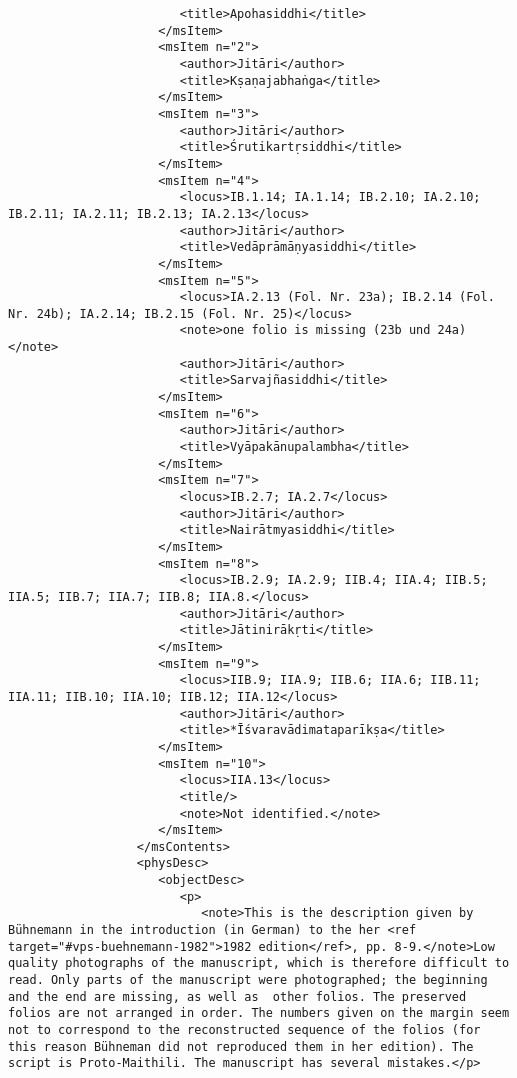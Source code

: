 \documentclass[article,12pt,a4paper]{memoir}%
\begin{document}
\begin{verbatim}
                        <title>Apohasiddhi</title>
                     </msItem>
                     <msItem n="2">
                        <author>Jitāri</author>
                        <title>Kṣaṇajabhaṅga</title>
                     </msItem>
                     <msItem n="3">
                        <author>Jitāri</author>
                        <title>Śrutikartṛsiddhi</title>
                     </msItem>
                     <msItem n="4">
                        <locus>IB.1.14; IA.1.14; IB.2.10; IA.2.10; IB.2.11; IA.2.11; IB.2.13; IA.2.13</locus>
                        <author>Jitāri</author>
                        <title>Vedāprāmāṇyasiddhi</title>
                     </msItem>
                     <msItem n="5">
                        <locus>IA.2.13 (Fol. Nr. 23a); IB.2.14 (Fol. Nr. 24b); IA.2.14; IB.2.15 (Fol. Nr. 25)</locus>
                        <note>one folio is missing (23b und 24a)</note>
                        <author>Jitāri</author>
                        <title>Sarvajñasiddhi</title>
                     </msItem>
                     <msItem n="6">
                        <author>Jitāri</author>
                        <title>Vyāpakānupalambha</title>
                     </msItem>
                     <msItem n="7">
                        <locus>IB.2.7; IA.2.7</locus>
                        <author>Jitāri</author>
                        <title>Nairātmyasiddhi</title>
                     </msItem>
                     <msItem n="8">
                        <locus>IB.2.9; IA.2.9; IIB.4; IIA.4; IIB.5; IIA.5; IIB.7; IIA.7; IIB.8; IIA.8.</locus>
                        <author>Jitāri</author>
                        <title>Jātinirākṛti</title>
                     </msItem>
                     <msItem n="9">
                        <locus>IIB.9; IIA.9; IIB.6; IIA.6; IIB.11; IIA.11; IIB.10; IIA.10; IIB.12; IIA.12</locus>
                        <author>Jitāri</author>
                        <title>*Īśvaravādimataparīkṣa</title>
                     </msItem>
                     <msItem n="10">
                        <locus>IIA.13</locus>
                        <title/>
                        <note>Not identified.</note>
                     </msItem>
                  </msContents>
                  <physDesc>
                     <objectDesc>
                        <p>
                           <note>This is the description given by Bühnemann in the introduction (in German) to the her <ref target="#vps-buehnemann-1982">1982 edition</ref>, pp. 8-9.</note>Low quality photographs of the manuscript, which is therefore difficult to read. Only parts of the manuscript were photographed; the beginning and the end are missing, as well as  other folios. The preserved folios are not arranged in order. The numbers given on the margin seem not to correspond to the reconstructed sequence of the folios (for this reason Bühneman did not reproduced them in her edition). The script is Proto-Maithili. The manuscript has several mistakes.</p>

\end{verbatim}
\end{document}
